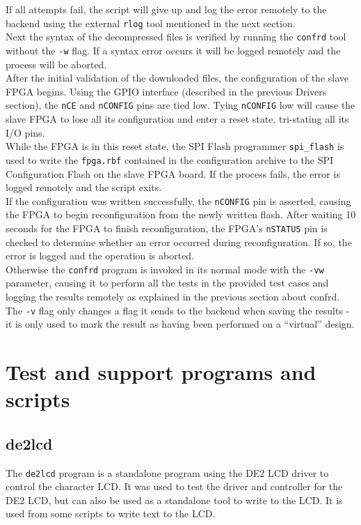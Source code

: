 If all attempts fail, the script will give up and log the error remotely to the backend using the
external \texttt{rlog} tool mentioned in the next section.
\\

Next the syntax of the decompressed files is verified by running the \texttt{confrd} tool
without the \texttt{-w} flag. If a syntax error occurs it will be logged remotely and the process
will be aborted.
\\

After the initial validation of the downloaded files, the configuration of the slave FPGA
begins. Using the GPIO interface (described in the previous Drivers section), the \texttt{nCE}
and \texttt{nCONFIG} pins are tied low. Tying \texttt{nCONFIG} low will cause the slave FPGA
to lose all its configuration and enter a reset state, tri-stating all its I/O pins.
\\

While the FPGA is in this reset state, the SPI Flash programmer \texttt{spi\_flash} is used
to write the \texttt{fpga.rbf} contained in the configuration archive to the SPI Configuration
Flash on the slave FPGA board. If the process fails, the error is logged remotely and the
script exits.
\\

If the configuration was written successfully, the \texttt{nCONFIG} pin is asserted, causing
the FPGA to begin reconfiguration from the newly written flash. After waiting 10 seconds
for the FPGA to finish reconfiguration, the FPGA's \texttt{nSTATUS} pin is checked to determine
whether an error occurred during reconfiguration. If so, the error is logged and the operation
is aborted.
\\

Otherwise the \texttt{confrd} program is invoked in its normal mode with the \texttt{-vw} parameter,
causing it to perform all the tests in the provided test cases and logging the results remotely
as explained in the previous section about confrd. The \texttt{-v} flag only changes a flag it sends
to the backend when saving the results - it is only used to mark the result as having been performed
on a ``virtual'' design.


\newpage
\section{Test and support programs and scripts}
\subsection{de2lcd}
The \texttt{de2lcd} program is a standalone program using the DE2 LCD driver to control
the character LCD. It was used to test the driver and controller for the DE2 LCD, but
can also be used as a standalone tool to write to the LCD. It is used from some scripts
to write text to the LCD.


